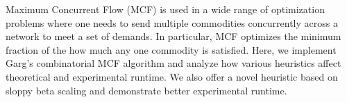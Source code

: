 
\noindent Maximum Concurrent Flow (MCF) is used in a wide range of optimization
problems where one needs to send multiple commodities concurrently
across a network to meet a set of demands. In particular, MCF
optimizes the minimum fraction of the how much any one commodity is
satisfied. Here, we implement Garg's combinatorial MCF algorithm and analyze how
various heuristics affect theoretical and experimental runtime.  We
also offer a novel heuristic based on sloppy beta scaling and
demonstrate better experimental runtime.


